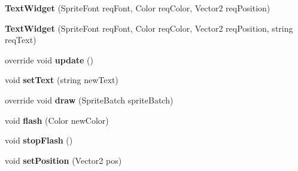 \begin{DoxyCompactItemize}
\item 
\hypertarget{class_simple_r_p_g_1_1_widgets_1_1_text_widget_ae761ed26cba45dabf2fc2be7b8dba38a}{{\bfseries Text\-Widget} (Sprite\-Font req\-Font, Color req\-Color, Vector2 req\-Position)}\label{class_simple_r_p_g_1_1_widgets_1_1_text_widget_ae761ed26cba45dabf2fc2be7b8dba38a}

\item 
\hypertarget{class_simple_r_p_g_1_1_widgets_1_1_text_widget_ae9e3cb7b4fbb8b7b04f92357dbd17fe0}{{\bfseries Text\-Widget} (Sprite\-Font req\-Font, Color req\-Color, Vector2 req\-Position, string req\-Text)}\label{class_simple_r_p_g_1_1_widgets_1_1_text_widget_ae9e3cb7b4fbb8b7b04f92357dbd17fe0}

\item 
\hypertarget{class_simple_r_p_g_1_1_widgets_1_1_text_widget_ae3f13c0514cc686cb7f6da6fd2165ed2}{override void {\bfseries update} ()}\label{class_simple_r_p_g_1_1_widgets_1_1_text_widget_ae3f13c0514cc686cb7f6da6fd2165ed2}

\item 
\hypertarget{class_simple_r_p_g_1_1_widgets_1_1_text_widget_af6ceb5dc2687ec28769d4b2298518d6d}{void {\bfseries set\-Text} (string new\-Text)}\label{class_simple_r_p_g_1_1_widgets_1_1_text_widget_af6ceb5dc2687ec28769d4b2298518d6d}

\item 
\hypertarget{class_simple_r_p_g_1_1_widgets_1_1_text_widget_a99fe0ea10942a791c12a44d714a8fef1}{override void {\bfseries draw} (Sprite\-Batch sprite\-Batch)}\label{class_simple_r_p_g_1_1_widgets_1_1_text_widget_a99fe0ea10942a791c12a44d714a8fef1}

\item 
\hypertarget{class_simple_r_p_g_1_1_widgets_1_1_text_widget_ac30d0584dbcb9d0c954aa3992465b9d4}{void {\bfseries flash} (Color new\-Color)}\label{class_simple_r_p_g_1_1_widgets_1_1_text_widget_ac30d0584dbcb9d0c954aa3992465b9d4}

\item 
\hypertarget{class_simple_r_p_g_1_1_widgets_1_1_text_widget_a9cb6e2092c1f2dc616b3c64260e9d5c3}{void {\bfseries stop\-Flash} ()}\label{class_simple_r_p_g_1_1_widgets_1_1_text_widget_a9cb6e2092c1f2dc616b3c64260e9d5c3}

\item 
\hypertarget{class_simple_r_p_g_1_1_widgets_1_1_text_widget_a3e2de1a7627205b0221e009190d9f0f2}{void {\bfseries set\-Position} (Vector2 pos)}\label{class_simple_r_p_g_1_1_widgets_1_1_text_widget_a3e2de1a7627205b0221e009190d9f0f2}

\end{DoxyCompactItemize}
